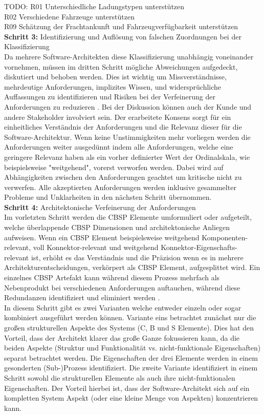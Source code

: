 TODO: 
R01 Unterschiedliche Ladungstypen unterstützen \\
R02 Verschiedene Fahrzeuge unterstützen \\
R09 Schätzung der Frachtankunft und Fahrzeugverfügbarkeit unterstützen \\

\textbf{Schritt 3:} Identifizierung und Auflösung von falschen Zuordnungen bei der Klassifizierung \\
Da mehrere Software-Architekten diese Klassifizierung unabhängig voneinander vornehmen, müssen im dritten Schritt mögliche Abweichungen aufgedeckt, diskutiert und behoben werden. Dies ist wichtig um Missverständnisse, mehrdeutige Anforderungen, implizites Wissen, und widersprüchliche Auffassungen zu identifizieren und Risiken bei der Verfeinerung der Anforderungen zu reduzieren \cite{Gru01}. Bei der Diskussion können auch der Kunde und andere Stakeholder involviert sein. Der erarbeitete Konsens sorgt für ein einheitliches Verständnis der Anforderungen und die Relevanz dieser für die Software-Architektur. Wenn keine Unstimmigkeiten mehr vorliegen werden die Anforderungen weiter ausgedünnt indem alle Anforderungen, welche eine geringere Relevanz haben als ein vorher definierter Wert der Ordinalskala, wie beispielsweise "weitgehend", vorerst verworfen werden. Dabei wird auf Abhängigkeiten zwischen den Anforderungen geachtet um kritische nicht zu verwerfen. Alle akzeptierten Anforderungen werden inklusive gesammelter Probleme und Unklarheiten in den nächsten Schritt übernommen. \\

\textbf{Schritt 4:} Architektonische Verfeinerung der Anforderungen \\
Im vorletzten Schritt werden die CBSP Elemente umformuliert oder aufgeteilt, welche überlappende CBSP Dimensionen und architektonische Anliegen aufweisen. Wenn ein CBSP Element beispielsweise weitgehend Komponenten-relevant, voll Konnektor-relevant und weitgehend Konnektor-Eigenschafts-relevant ist, erhöht es das Verständnis und die Präzision wenn es in mehrere Architekturentscheidungen, verkörpert als CBSP Element, aufgesplittet wird. Ein einzelnes CBSP Artefakt kann während diesem Prozess mehrfach als Nebenprodukt bei verschiedenen Anforderungen auftauchen, während diese Redundanzen identifiziert und eliminiert werden \cite{Gru01}. \\
In diesem Schritt gibt es zwei Varianten welche entweder einzeln oder sogar kombiniert ausgeführt werden können. Variante eins betrachtet zunächst nur die großen strukturellen Aspekte des Systems (C, B und S Elemente). Dies hat den Vorteil, dass der Architekt klarer das große Ganze fokussieren kann, da die beiden Aspekte (Struktur und Funktionalität vs. nicht-funktionale Eigenschaften) separat betrachtet werden. Die Eigenschaften der drei Elemente werden in einem gesonderten (Sub-)Prozess identifiziert. Die zweite Variante identifiziert in einem Schritt sowohl die strukturellen Elemente als auch ihre nicht-funktionalen Eigenschaften. Der Vorteil hierbei ist, dass der Software-Architekt sich auf ein kompletten System Aspekt (oder eine kleine Menge von Aspekten) konzentrieren kann. \\

